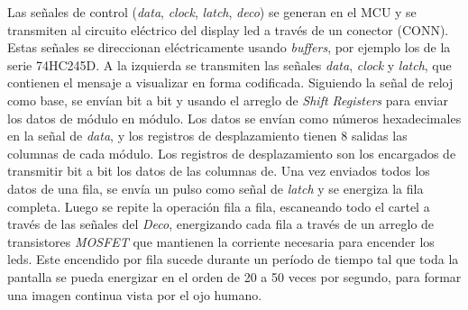 Las señales de control (\textit{data}, \textit{clock}, \textit{latch}, \textit{deco}) se generan en el MCU y se transmiten al circuito eléctrico del display led a través de un conector (CONN). Estas señales se direccionan eléctricamente usando \textit{buffers}, por ejemplo los de la serie 74HC245D. A la izquierda se transmiten las señales \textit{data}, \textit{clock} y \textit{latch}, que contienen el mensaje a visualizar en forma codificada. Siguiendo la señal de reloj como base, se envían bit a bit  y usando el arreglo de \textit{Shift Registers} para enviar los datos de módulo en módulo. Los datos se envían como números hexadecimales en la señal de \textit{data}, y los registros de desplazamiento tienen 8 salidas las columnas de cada módulo. Los registros de desplazamiento son los encargados de transmitir bit a bit los datos de las columnas de. Una vez enviados todos los datos de una fila, se envía un pulso como señal de \textit{latch} y se energiza la fila completa. Luego se repite la operación fila a fila, escaneando todo el cartel a través de las señales del \textit{Deco}, energizando cada fila a través de un arreglo de transistores \textit{MOSFET} que mantienen la corriente necesaria para encender los leds. Este encendido por fila sucede durante un período de tiempo tal que toda la pantalla se pueda energizar en el orden de 20 a 50 veces por segundo, para formar una imagen continua vista por el ojo humano.\\

